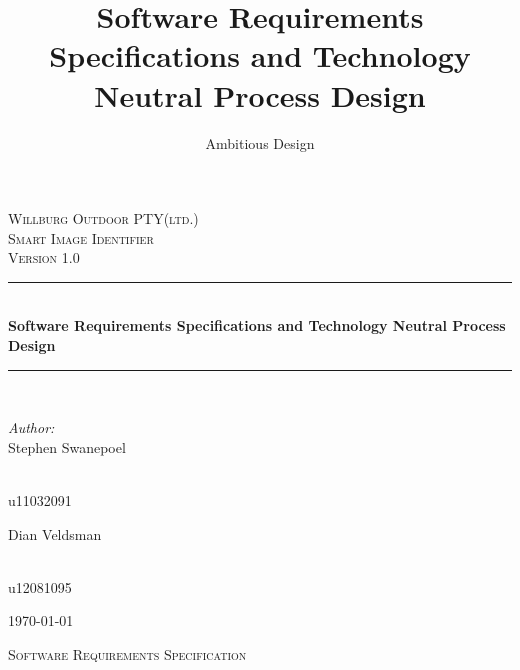 \documentclass[a4paper,12pt]{report}
\author{Ambitious Design}
\title{ Software Requirements Specifications and Technology Neutral Process Design}
\newcommand{\HRule}{\rule{\linewidth}{0.5mm}}
\begin{document}
\setlength{\parskip}{6pt}

\begin{titlepage}

\begin{center}
\textsc{\LARGE Willburg Outdoor PTY(ltd.)}\\[1.5cm]
\textsc{\Large Smart Image Identifier }\\[1.0cm]
\textsc{\Large Version 1.0 }\\[0.5cm]
\HRule \\[0.4cm]
{ \huge \bfseries  Software Requirements Specifications and Technology Neutral Process Design}\\[0.4cm]
\HRule \\[0.4cm]
\begin{minipage}{0.4\textwidth}
\begin{flushleft} \large
\emph{Author:}\\
Stephen {Swanepoel}
\end{flushleft}
\end{minipage}
\begin{minipage}{0.4\textwidth}
\begin{flushright} \large
\emph{} \\
u11032091
\end{flushright}
\end{minipage}
\begin{minipage}{0.4\textwidth}
\begin{flushleft} \large
Dian {Veldsman}
\end{flushleft}
\end{minipage}
\begin{minipage}{0.4\textwidth}
\begin{flushright} \large
\emph{} \\
u12081095
\end{flushright}
\end{minipage}

{\large \today}
\end{center}
\end{titlepage}
\footnotesize
\normalsize

\renewcommand{\thesection}{\arabic{section}}
\newpage
\begin{center}
\textsc{\LARGE Software Requirements Specification}\\[1.5cm]
\end{center}
\end{document}
